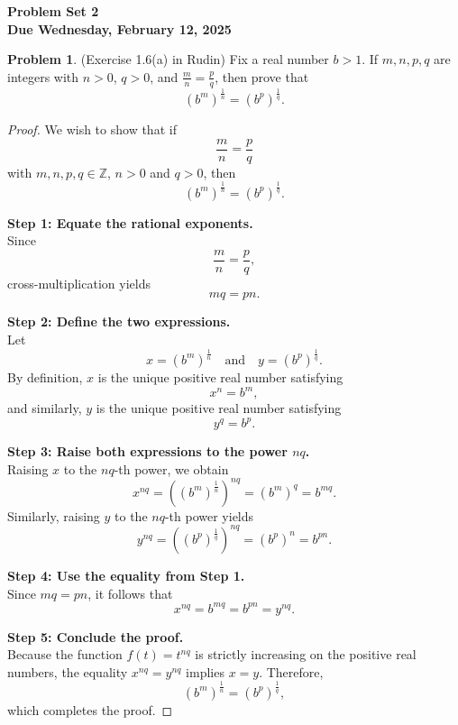 \documentclass[12pt,oneside]{article}
\theoremstyle{definition}
\newtheorem{problem}{Problem}
\begin{document}
\pagestyle{fancy}


\begin{center}
\bf \Large
Problem Set 2 \\[0.5 em]
\large
Due Wednesday, February 12, 2025
\end{center}

\bigskip

\begin{problem}
(Exercise 1.6(a) in Rudin)
Fix a real number $b > 1$. 
If $m, n, p, q$ are integers with $n>0$, $q>0$, and $\frac{m}{n} = \frac{p}{q}$, then prove that
\[
(b^m)^{\frac{1}{n}} = (b^p)^{\frac{1}{q}}.
\]
\end{problem}


\begin{proof}
    We wish to show that if
    \[
    \frac{m}{n} = \frac{p}{q}
    \]
    with \(m,n,p,q\in\mathbb{Z}\), \(n>0\) and \(q>0\), then
    \[
    (b^m)^{\frac{1}{n}} = (b^p)^{\frac{1}{q}}.
    \]
    
    \medskip
    
    \textbf{Step 1: Equate the rational exponents.}\\
    Since
    \[
    \frac{m}{n} = \frac{p}{q},
    \]
    cross-multiplication yields
    \[
    m q = p n.
    \]
    
    \medskip
    
    \textbf{Step 2: Define the two expressions.}\\
    Let
    \[
    x = (b^m)^{\frac{1}{n}} \quad \text{and} \quad y = (b^p)^{\frac{1}{q}}.
    \]
    By definition, \(x\) is the unique positive real number satisfying
    \[
    x^n = b^m,
    \]
    and similarly, \(y\) is the unique positive real number satisfying
    \[
    y^q = b^p.
    \]
    
    \medskip
    
    \textbf{Step 3: Raise both expressions to the power \(nq\).}\\
    Raising \(x\) to the \(nq\)-th power, we obtain
    \[
    x^{nq} = \left((b^m)^{\frac{1}{n}}\right)^{nq} = (b^m)^q = b^{mq}.
    \]
    Similarly, raising \(y\) to the \(nq\)-th power yields
    \[
    y^{nq} = \left((b^p)^{\frac{1}{q}}\right)^{nq} = (b^p)^n = b^{pn}.
    \]
    
    \medskip
    
    \textbf{Step 4: Use the equality from Step 1.}\\
    Since \(mq = pn\), it follows that
    \[
    x^{nq} = b^{mq} = b^{pn} = y^{nq}.
    \]
    
    \medskip
    
    \textbf{Step 5: Conclude the proof.}\\
    Because the function \(f(t)=t^{nq}\) is strictly increasing on the positive real numbers, the equality \(x^{nq} = y^{nq}\) implies \(x=y\). Therefore,
    \[
    (b^m)^{\frac{1}{n}} = (b^p)^{\frac{1}{q}},
    \]
    which completes the proof.
    \end{proof}
\end{document}
